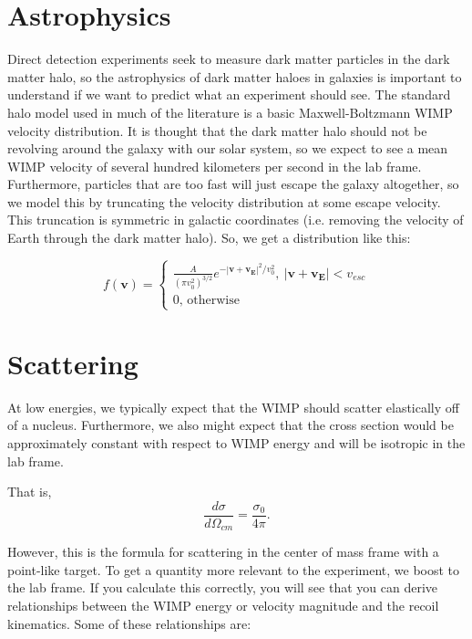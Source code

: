 \documentclass{article}
\begin{document}
\section{Astrophysics}

Direct detection experiments seek to measure dark matter particles in the dark matter halo, so the astrophysics of dark matter haloes in galaxies is important to understand if we want to predict what an experiment should see.
The standard halo model used in much of the literature is a basic Maxwell-Boltzmann WIMP velocity distribution.
It is thought that the dark matter halo should not be revolving around the galaxy with our solar system, so 
we expect to see a mean WIMP velocity of several hundred kilometers per second in the lab frame. Furthermore, particles that are too fast will just escape the galaxy altogether, so we model this by truncating the velocity distribution at some escape velocity. This truncation is symmetric in galactic coordinates (i.e. removing the velocity of Earth through the dark matter halo). So, we get a distribution like this:

\begin{equation}
f(\mathbf{v}) = \left\{\begin{array}{l} \frac{A}{(\pi v_0^2)^{3/2}}e^{-|\mathbf{v}+\mathbf{v_E}|^2/v_0^2},\ |\mathbf{v}+\mathbf{v_E}|<v_{esc}\\ 0\textrm{, otherwise} \end{array} \right.
\end{equation}

\section{Scattering}

At low energies, we typically expect that the WIMP should scatter elastically off of a nucleus. 
Furthermore, we also might expect that the cross section would be approximately constant with
respect to WIMP energy and will be isotropic in the lab frame.

That is,
\begin{equation}
\frac{d\sigma}{d\Omega_{cm}} = \frac{\sigma_0}{4\pi}.
\end{equation}

However, this is the formula for scattering in the center of mass frame with a point-like target. To
get a quantity more relevant to the experiment, we boost to the lab frame. If you calculate this 
correctly, you will see that you can derive relationships between the WIMP energy or velocity magnitude
and the recoil kinematics. Some of these relationships are:
\end{document}

